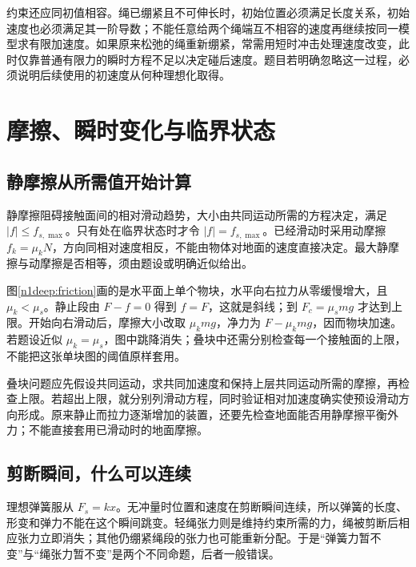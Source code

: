 约束还应同初值相容。绳已绷紧且不可伸长时，初始位置必须满足长度关系，初始速度也必须满足其一阶导数；不能任意给两个绳端互不相容的速度再继续按同一模型求有限加速度。如果原来松弛的绳重新绷紧，常需用短时冲击处理速度改变，此时仅靠普通有限力的瞬时方程不足以决定碰后速度。题目若明确忽略这一过程，必须说明后续使用的初速度从何种理想化取得。

\section{摩擦、瞬时变化与临界状态}
\subsection{静摩擦从所需值开始计算}
静摩擦阻碍接触面间的相对滑动趋势，大小由共同运动所需的方程决定，满足 $|f|\le f_{s,\max}$。只有处在临界状态时才令 $|f|=f_{s,\max}$。已经滑动时采用动摩擦 $f_k=\mu_kN$，方向同相对速度相反，不能由物体对地面的速度直接决定。最大静摩擦与动摩擦是否相等，须由题设或明确近似给出。

图\ref{n1deep:friction}画的是水平面上单个物块，水平向右拉力从零缓慢增大，且 $\mu_k<\mu_s$。静止段由 $F-f=0$ 得到 $f=F$，这就是斜线；到 $F_c=\mu_smg$ 才达到上限。开始向右滑动后，摩擦大小改取 $\mu_kmg$，净力为 $F-\mu_kmg$，因而物块加速。若题设近似 $\mu_k=\mu_s$，图中跳降消失；叠块中还需分别检查每一个接触面的上限，不能把这张单块图的阈值原样套用。

叠块问题应先假设共同运动，求共同加速度和保持上层共同运动所需的摩擦，再检查上限。若超出上限，就分别列滑动方程，同时验证相对加速度确实使预设滑动方向形成。原来静止而拉力逐渐增加的装置，还要先检查地面能否用静摩擦平衡外力；不能直接套用已滑动时的地面摩擦。

\subsection{剪断瞬间，什么可以连续}
理想弹簧服从 $F_s=kx$。无冲量时位置和速度在剪断瞬间连续，所以弹簧的长度、形变和弹力不能在这个瞬间跳变。轻绳张力则是维持约束所需的力，绳被剪断后相应张力立即消失；其他仍绷紧绳段的张力也可能重新分配。于是“弹簧力暂不变”与“绳张力暂不变”是两个不同命题，后者一般错误。

